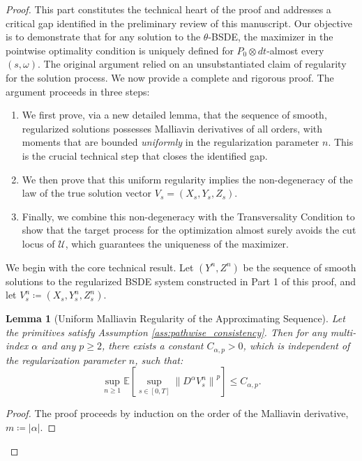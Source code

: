 \documentclass[12pt, letterpaper]{amsart}
\newcommand{\Ucal}{\mathcal{U}}
\newcommand{\norm}[1]{\left\lVert#1\right\rVert}
\theoremstyle{plain}
\newtheorem{lemma}[theorem]{Lemma}
\theoremstyle{definition}
\theoremstyle{remark}
\numberwithin{equation}{section} %
\begin{document}
\begin{proof}
This part constitutes the technical heart of the proof and addresses a critical gap identified in the preliminary review of this manuscript. Our objective is to demonstrate that for any solution to the \(\theta\)-BSDE, the maximizer in the pointwise optimality condition is uniquely defined for \(P_0 \otimes dt\)-almost every \((s,\omega)\). The original argument relied on an unsubstantiated claim of regularity for the solution process. We now provide a complete and rigorous proof. The argument proceeds in three steps:
\begin{enumerate}
    \item We first prove, via a new detailed lemma, that the sequence of smooth, regularized solutions possesses Malliavin derivatives of all orders, with moments that are bounded \emph{uniformly} in the regularization parameter \(n\). This is the crucial technical step that closes the identified gap.
    \item We then prove that this uniform regularity implies the non-degeneracy of the law of the true solution vector \(V_s = (X_s, Y_s, Z_s)\).
    \item Finally, we combine this non-degeneracy with the Transversality Condition to show that the target process for the optimization almost surely avoids the cut locus of \(\Ucal\), which guarantees the uniqueness of the maximizer.
\end{enumerate}

We begin with the core technical result. Let \((Y^n, Z^n)\) be the sequence of smooth solutions to the regularized BSDE system constructed in Part 1 of this proof, and let \(V^n_s \coloneqq (X_s, Y^n_s, Z^n_s)\).

\begin{lemma}[Uniform Malliavin Regularity of the Approximating Sequence]
\label{lem:uniform_malliavin_regularity_full_proof}
Let the primitives satisfy Assumption \ref{ass:pathwise_consistency}. Then for any multi-index \(\alpha\) and any \(p \ge 2\), there exists a constant \(C_{\alpha,p} > 0\), which is independent of the regularization parameter \(n\), such that:
\[
\sup_{n \ge 1} \mathbb{E}\left[\sup_{s \in [0,T]} \norm{D^\alpha V^n_s}^p\right] \le C_{\alpha,p}.
\]
\end{lemma}

\begin{proof}
The proof proceeds by induction on the order of the Malliavin derivative, \(m \coloneqq |\alpha|\).


\end{proof}
\end{proof}
\end{document}

